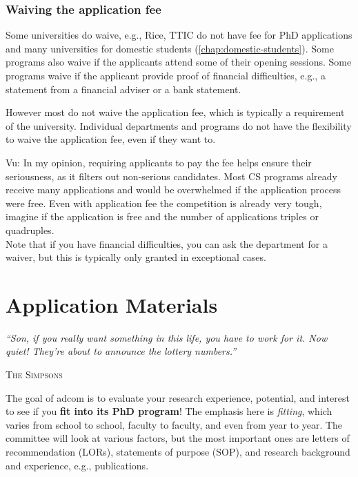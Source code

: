 \documentclass[oneside,11pt,dvipsnames]{book}
\newcommand{\myepigraphsimpsons}[1]{
\epigraph{\vspace{-0.2in} \emph{#1}}{\textsc{The Simpsons}}
}
\newenvironment{commentbox}[1][]{
  \small
  \begin{mybox}
    {\small \textbf{#1}}
  }{
  \end{mybox}
}
\begin{document}
\section{Waiving the application fee}\label{sec:fee-waive}

Some universities do waive, e.g., Rice, TTIC do not have fee for PhD applications and many universities for domestic students (\autoref{chap:domestic-students}).
Some programs also waive if the applicants attend some of their opening sessions.  Some programs waive if the applicant provide proof of financial difficulties, e.g., a statement from a financial adviser or a bank statement.

However most do not waive the application fee, which is typically a requirement of the university. Individual departments and programs do not have the flexibility to waive the application fee, even if they want to.

\begin{commentbox}{Vu:}
In my opinion, requiring applicants to pay the fee helps ensure their seriousness, as it filters out non-serious candidates. Most CS programs already receive many applications and would be overwhelmed if the application process were free.  Even with application fee the competition is already very tough, imagine if the application is free and the number of applications triples or quadruples.\\

Note that if you have financial difficulties, you can ask the department for a waiver, but this is typically only granted in exceptional cases.
\end{commentbox}



\part{Application Materials}\label{part:application}


\myepigraphsimpsons{``Son, if you really want something in this life, you have to work for it. Now quiet! They're about to announce the lottery numbers.''}


The goal of adcom is to evaluate your research experience, potential, and interest to see if you \textbf{fit into its PhD program}! The emphasis here is \emph{fitting}, which varies from school to school, faculty to faculty, and even from year to year.  
The committee will look at various factors, but the most important ones are letters of recommendation (LORs),  statements of purpose (SOP), and research background and experience, e.g., publications.
\end{document}
